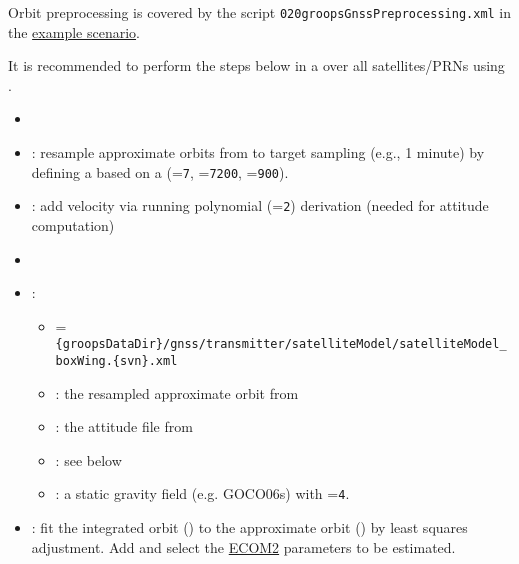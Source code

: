 Orbit preprocessing is covered by the script \verb|020groopsGnssPreprocessing.xml| in the \href{https://ftp.tugraz.at/outgoing/ITSG/groops/scenario/scenarioGnssNetwork.zip}{example scenario}.

It is recommended to perform the steps below in a  over all
satellites/PRNs using .

\begin{itemize}
  \item {}
  \item {}: resample approximate orbits from  to target sampling (e.g., 1 minute) by defining a  based on a  (=\verb|7|, =\verb|7200|, =\verb|900|).
  \item {}: add velocity via running polynomial (=\verb|2|) derivation (needed for attitude computation)
  \item {}
  \item {}:
        \begin{itemize}
          \item {}=\verb|{groopsDataDir}/gnss/transmitter/satelliteModel/satelliteModel_boxWing.{svn}.xml|
          \item {}: the resampled approximate orbit from 
          \item {}: the attitude file from 
          \item {}: see below
          \item {}: a static gravity field (e.g. GOCO06s) with =\verb|4|.
        \end{itemize}
  \item {}: fit the integrated orbit () to the approximate orbit () by least squares adjustment.
        Add 
        and select the \href{https://doi.org/10.1007/s00190-015-0814-4}{ECOM2} parameters to be estimated.
\end{itemize}

